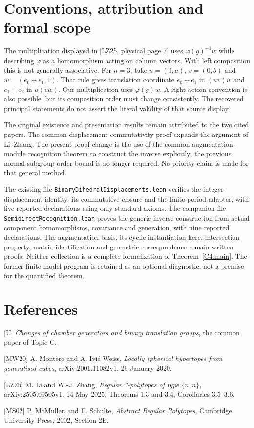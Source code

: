 \section{Conventions, attribution and formal scope}
The multiplication displayed in [LZ25, physical page 7] uses
$\varphi(g)^{-1}w$ while describing $\varphi$ as a homomorphism acting
on column vectors. With left composition this is not generally
associative. For $n=3$, take
$u=(0,a)$, $v=(0,b)$ and $w=(e_0+e_1,1)$.
That rule gives translation coordinate $e_0+e_1$ in $(uv)w$ and
$e_1+e_2$ in $u(vw)$. Our multiplication uses $\varphi(g)w$.
A right-action convention is also possible, but its composition order
must change consistently. The recovered principal statements do not
assert the literal validity of that source display.

The original existence and presentation results remain attributed to
the two cited papers. The common displacement-commutativity proof
expands the argument of Li--Zhang. The present proof change is the use
of the common augmentation-module recognition theorem to construct
the inverse explicitly; the previous normal-subgroup order bound is
no longer required. No priority claim is made for that general method.

The existing file \texttt{BinaryDihedralDisplacements.lean} verifies
the integer displacement identity, its commutative closure and the
finite-period adapter, with five reported declarations using only
standard axioms. The companion file \texttt{SemidirectRecognition.lean} proves the
generic inverse construction from actual component homomorphisms,
covariance and generation, with nine reported declarations. The
augmentation basis, its cyclic instantiation here, intersection property,
matrix identification and geometric correspondence remain written proofs.
Neither collection is a complete formalization of
Theorem~\ref{C4.main}.
The former finite model program is retained as an optional diagnostic,
not a premise for the quantified theorem.

\section*{References}
{[}U{]} \emph{Changes of chamber generators and binary translation groups},
the common paper of Topic C.

{[}MW20{]} A. Montero and A. Ivi\'c Weiss,
\emph{Locally spherical hypertopes from generalised cubes},
arXiv:2001.11082v1, 29 January 2020.

{[}LZ25{]} M. Li and W.-J. Zhang,
\emph{Regular 3-polytopes of type $\{n,n\}$},
arXiv:2505.09505v1, 14 May 2025. Theorems 1.3 and 3.4,
Corollaries 3.5--3.6.

{[}MS02{]} P. McMullen and E. Schulte,
\emph{Abstract Regular Polytopes}, Cambridge University Press, 2002,
Section 2E.

